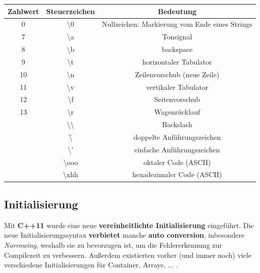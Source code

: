 \documentclass[a4paper]{report}
\begin{document}
\begin{center}
\begin{tabular}{|ccc|} \hline
	\textbf{Zahlwert} & \textbf{Steuerzeichen} & \textbf{Bedeutung} \\ \hline
	0 & \textbackslash 0 & Nullzeichen: Markierung vom Ende eines Strings \\
	7 & \textbackslash a & Tonsignal \\ \hline
	8 & \textbackslash b & backspace \\
	9 & \textbackslash t & horizontaler Tabulator \\ \hline
	10 & \textbackslash n & Zeilenvorschub (neue Zeile) \\
	11 & \textbackslash v & vertikaler Tabulator \\ \hline
	12 & \textbackslash f & Seitenvorschub \\
	13 & \textbackslash r & Wagenrücklauf \\ \hline
	& \textbackslash \textbackslash & Backslash \\
	& \textbackslash \" & doppelte Anführungszeichen \\ \hline
	& \textbackslash ' & einfache Anführungszeichen \\
	& \textbackslash ooo & oktaler Code (ASCII) \\ \hline
	& \textbackslash xhh & hexadezimaler Code (ASCII) \\ \hline
\end{tabular}
	\end{center}


\subsection{Initialisierung}
Mit \textbf{C++11} wurde eine neue \textbf{vereinheitlichte Initialisierung} eingeführt. Die neue Initialisierungssyntax \textbf{verbietet} manche \textbf{auto conversion}, inbesondere \textit{Narrowing}, weshalb sie zu bevorzugen ist, um die Fehlererkennung zur Compilezeit zu verbessern. Außerdem existierten vorher (und immer noch) viele verschiedene Initialisierungen für Container, Arrays, ... .
\end{document}
